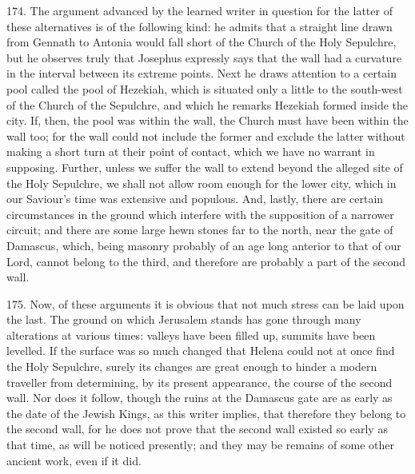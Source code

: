 174.
The argument advanced by the learned writer in question for the latter
of these alternatives is of the following kind: he admits that a
straight line drawn from Gennath to Antonia would fall short of the
Church of the Holy Sepulchre, but he observes truly that Josephus
expressly says that the wall had a curvature in the interval between
its extreme points. Next he draws attention to a certain pool called
the pool of Hezekiah, which is situated only a little to the
south-west of the Church of the Sepulchre, and which he remarks
Hezekiah formed inside the city. If, then, the pool was within the
wall, the Church must have been within the wall too; for the wall
could not include the former and exclude the latter without making a
short turn at their point of contact, which we have no warrant in
supposing. Further, unless we suffer the wall to extend beyond
the alleged site of the Holy Sepulchre, we shall not allow room enough
for the lower city, which in our Saviour's time was extensive and
populous. And, lastly, there are certain circumstances in the ground
which interfere with the supposition of a narrower circuit; and there
are some large hewn stones far to the north, near the gate of
Damascus, which, being masonry probably of an age long anterior to
that of our Lord, cannot belong to the third, and therefore are
probably a part of the second wall.

175.
Now, of these arguments it is obvious that not much stress can be laid
upon the last. The ground on which Jerusalem stands has gone through
many alterations at various times: valleys have been filled up,
summits have been levelled. If the surface was so much changed that
Helena could not at once find the Holy Sepulchre, surely its changes
are great enough to hinder a modern traveller from determining, by its
present appearance, the course of the second wall. Nor does it follow,
though the ruins at the Damascus gate are as early as the date of the
Jewish Kings, as this writer implies, that therefore they belong to
the second wall, for he does not prove that the second wall existed so
early as that time, as will be noticed presently; and they may be
remains of some other ancient work, even if it did.


